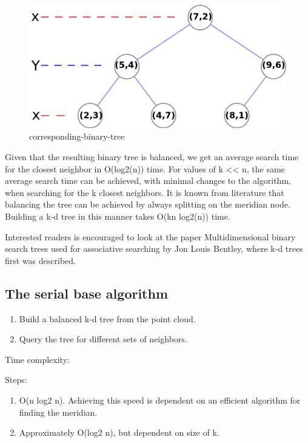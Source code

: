 \begin{figure}[ht!]
\centering
\includegraphics[width=120mm]{../gfx/Tree_0001.png}

\caption{corresponding-binary-tree}
\label{fig:tree_0001}
\end{figure}

Given that the resulting binary tree is balanced, we get an average search time for the closest neighbor in O(log2(n)) time. For values of k << n, the same average search time can be achieved, with minimal changes to the algorithm, when searching for the k closest neighbors. It is known from literature that balancing the tree can be achieved by always splitting on the meridian node. Building a k-d tree in this manner takes O(kn log2(n)) time.

Interested readers is encouraged to look at the paper Multidimensional binary search trees used for associative searching by Jon Louis Bentley, where k-d trees first was described.



\subsection{The serial base algorithm} %
\label{ssub:the_serial_base_algorithm}

\begin{enumerate}
    \item Build a balanced k-d tree from the point cloud.
    \item Query the tree for different sets of neighbors.
\end{enumerate}

Time complexity:

Steps:
\begin{enumerate}
    \item O(n log2 n). Achieving this speed is dependent on an efficient algorithm for finding the meridian.
    \item Approximately O(log2 n), but dependent on size of k.
\end{enumerate}


